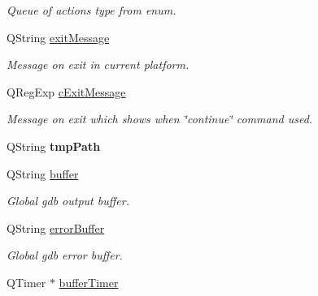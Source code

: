 \begin{DoxyCompactItemize}
\begin{DoxyCompactList}\small\item\em Queue of actions type from enum. \end{DoxyCompactList}\item 
\hypertarget{class_debugger_a20e69b676082292edf0fdbee0a13aeb0}{}Q\+String \hyperlink{class_debugger_a20e69b676082292edf0fdbee0a13aeb0}{exit\+Message}\label{class_debugger_a20e69b676082292edf0fdbee0a13aeb0}

\begin{DoxyCompactList}\small\item\em Message on exit in current platform. \end{DoxyCompactList}\item 
\hypertarget{class_debugger_af5894be0b78a8cc36b1d1b99dd71ef97}{}Q\+Reg\+Exp \hyperlink{class_debugger_af5894be0b78a8cc36b1d1b99dd71ef97}{c\+Exit\+Message}\label{class_debugger_af5894be0b78a8cc36b1d1b99dd71ef97}

\begin{DoxyCompactList}\small\item\em Message on exit which shows when \char`\"{}continue\char`\"{} command used. \end{DoxyCompactList}\item 
\hypertarget{class_debugger_a9182a784eaf8f0e5fd6fd56c4d78000a}{}Q\+String {\bfseries tmp\+Path}\label{class_debugger_a9182a784eaf8f0e5fd6fd56c4d78000a}

\item 
\hypertarget{class_debugger_a55d82d638b0be2683dcf654696e994c0}{}Q\+String \hyperlink{class_debugger_a55d82d638b0be2683dcf654696e994c0}{buffer}\label{class_debugger_a55d82d638b0be2683dcf654696e994c0}

\begin{DoxyCompactList}\small\item\em Global gdb output buffer. \end{DoxyCompactList}\item 
\hypertarget{class_debugger_aa81988662cf102a4b9db3f5e05b4da1c}{}Q\+String \hyperlink{class_debugger_aa81988662cf102a4b9db3f5e05b4da1c}{error\+Buffer}\label{class_debugger_aa81988662cf102a4b9db3f5e05b4da1c}

\begin{DoxyCompactList}\small\item\em Global gdb error buffer. \end{DoxyCompactList}\item 
\hypertarget{class_debugger_a991fd6cbd4a6b6983f1c4913600df67f}{}Q\+Timer $\ast$ \hyperlink{class_debugger_a991fd6cbd4a6b6983f1c4913600df67f}{buffer\+Timer}\label{class_debugger_a991fd6cbd4a6b6983f1c4913600df67f}


\end{DoxyCompactItemize}
